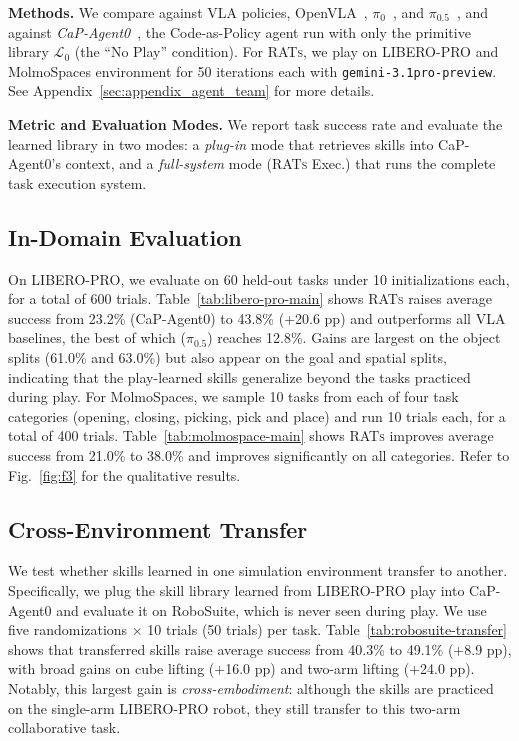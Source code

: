 \textbf{Methods.} We compare against VLA policies, OpenVLA~\cite{openvla},
$\pi_0$~\citep{black2025pi0}, and
$\pi_{0.5}$~\citep{physicalintelligence2025pi05}, and against
\emph{CaP-Agent0}~\cite{fu2026capx}, the Code-as-Policy agent run with only the primitive library $\mathcal{L}_0$ (the ``No Play'' condition). For \textsc{RATs}, we play on LIBERO-PRO and MolmoSpaces environment for 50 iterations each with \texttt{gemini-3.1pro-preview}. See Appendix~\ref{sec:appendix_agent_team} for more details.

\textbf{Metric and Evaluation Modes.} We report task success rate and evaluate the
learned library in two modes: a \emph{plug-in} mode that retrieves skills into CaP-Agent0's context, and a \emph{full-system} mode (\textsc{RATs} Exec.) that runs the complete task execution system.

\subsection{In-Domain Evaluation}
\label{subsec:in-domain-molmo}

On LIBERO-PRO, we evaluate on 60 held-out tasks under 10 initializations each, for a total of 600 trials.
Table~\ref{tab:libero-pro-main} shows \textsc{RATs} raises average success from 23.2\% (CaP-Agent0) to 43.8\% (+20.6 pp) and outperforms all VLA baselines, the best of which ($\pi_{0.5}$) reaches 12.8\%. Gains are largest on the object splits
(61.0\% and 63.0\%) but also appear on the goal and spatial splits, indicating
that the play-learned skills generalize beyond the tasks practiced during play.
For MolmoSpaces, we sample 10 tasks from each of four task categories (opening, closing, picking, pick and place) and run 10 trials each, for a total of 400 trials.
Table~\ref{tab:molmospace-main} shows \textsc{RATs} improves average success from 21.0\% to 38.0\% and improves significantly on all categories. Refer to Fig.~\ref{fig:f3} for the qualitative results.


\subsection{Cross-Environment Transfer}
\label{subsec:cross-env-transfer}
We test whether skills learned in one simulation environment transfer to another. Specifically, we plug the skill library learned from LIBERO-PRO play into CaP-Agent0 and evaluate it on RoboSuite, which is never seen during play.
We use five randomizations $\times$ 10 trials
(50 trials) per task.
Table~\ref{tab:robosuite-transfer} shows that transferred skills raise average success from 40.3\% to 49.1\% (+8.9 pp), with broad gains on cube lifting (+16.0 pp) and two-arm lifting (+24.0 pp). Notably, this largest gain is \textit{cross-embodiment}: although the skills are practiced on the single-arm LIBERO-PRO robot, they still transfer to this two-arm collaborative task.



